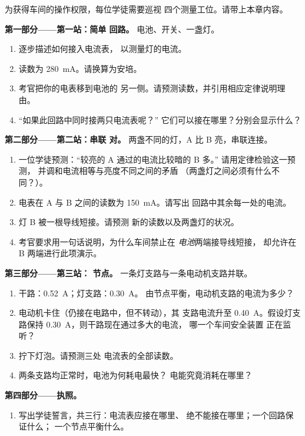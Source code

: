 \begin{problem}\label{pb:g8:intensity-ammeter:1}
为获得车间的操作权限，每位学徒需要巡视
四个测量工位。请带上本章内容。

\medskip\noindent\textbf{第一部分——第一站：简单
回路。}
电池、开关、一盏灯。
\begin{enumerate}
  \item 逐步描述如何接入电流表，
        以测量灯的电流。
  \item 读数为 \qty{280}{mA}。请换算为安培。
  \item 考官把你的电表移到电池的
        另一侧。请预测读数，并引用相应定律说明理由。
  \item “如果此回路中同时接两只电流表呢？”
        它们可以接在哪里？分别会显示什么？
\end{enumerate}

\medskip\noindent\textbf{第二部分——第二站：串联
对。}
两盏不同的灯，A 比 B 亮，串联连接。
\begin{enumerate}[resume]
  \item 一位学徒预测：“较亮的 A 通过的电流比较暗的 B 多。”
        请用定律检验这一预测，
        并调和电流相等与亮度不同之间的矛盾
        （两盏灯之间必须有什么不同？）。
  \item 电表在 A 与 B 之间的读数为 \qty{150}{mA}。请写出
        回路中其余每一处的电流。
  \item 灯 B 被一根导线短接。请预测
        新的读数以及两盏灯的状况。
  \item 考官要求用一句话说明，为什么车间禁止在
        \emph{电池}两端接导线短接，
        却允许在 B 两端进行此项演示。
\end{enumerate}

\medskip\noindent\textbf{第三部分——第三站：
节点。}
一条灯支路与一条电动机支路并联。
\begin{enumerate}[resume]
  \item 干路：\qty{0.52}{A}；灯支路：\qty{0.30}{A}。
        由节点平衡，电动机支路的电流为多少？
  \item 电动机卡住（仍接在电路中，但不转动），其
        支路电流升至 \qty{0.40}{A}。假设灯支路保持
        \qty{0.30}{A}，则干路现在通过多大的电流，
        哪一个车间安全装置
        正在监听？
  \item 拧下灯泡。请预测三处
        电流表的全部读数。
  \item 两条支路均正常时，电池为何耗电最快？
        电能究竟消耗在哪里？
\end{enumerate}

\medskip\noindent\textbf{第四部分——执照。}
\begin{enumerate}[resume]
  \item 写出学徒誓言，共三行：电流表应接在哪里、
        绝不能接在哪里；一个回路保证什么；
        一个节点平衡什么。
\end{enumerate}
\end{problem}
